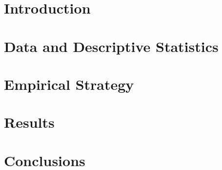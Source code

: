 \vfill

\newpage    

         
 

\section{Introduction}\label{section:01}
 


 
\section{Data and Descriptive Statistics}\label{section:02}



\section{ Empirical Strategy}\label{section:03}


\section{Results} \label{section:04}

 

  
\section{Conclusions} \label{section:05}

 
 
  
 \newpage




\appendix 
\newpage
\label{section:app}





 
